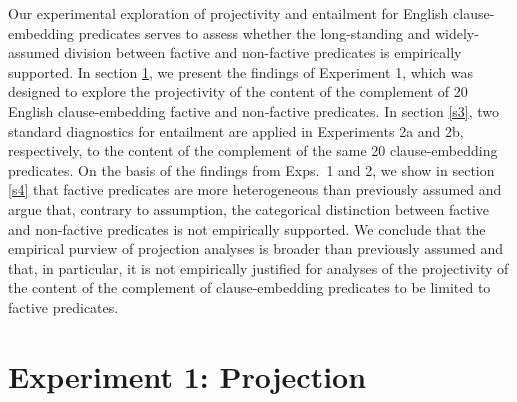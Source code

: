 \documentclass[11pt,fleqn]{article}
\newcommand{\6}{\mbox{$[\hspace*{-.6mm}[$}}
\newcommand{\9}{\mbox{$]\hspace*{-.6mm}]$}}
\begin{document}
Our experimental exploration of projectivity and entailment for English clause-embedding predicates serves to assess whether the long-standing and widely-assumed division between factive and non-factive predicates is empirically supported. In section \ref{s2}, we present the findings of Experiment 1, which was designed to explore the projectivity of the content of the complement of 20 English clause-embedding factive and non-factive predicates.%
In section \ref{s3}, two standard diagnostics for entailment are applied in Experiments 2a and 2b, respectively, to the content of the complement of the same 20 clause-embedding predicates. On the basis of the findings from Exps.~1 and 2, we show in section \ref{s4} that factive predicates are more heterogeneous than previously assumed and argue that, contrary to assumption, the categorical distinction between factive and non-factive predicates is not empirically supported. We conclude that  the empirical purview of projection analyses is broader than previously assumed and that, in particular, it is not empirically justified for analyses of the projectivity of the content of the complement of clause-embedding predicates to be limited to factive predicates.


\newpage

\section{Experiment 1: Projection}\label{s2}
\end{document}

